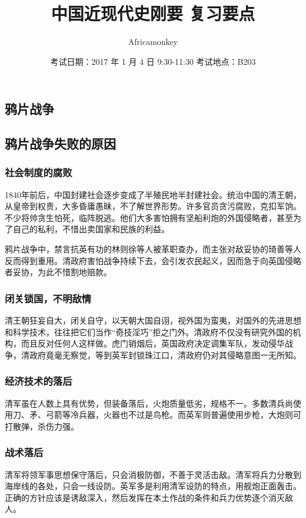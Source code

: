\documentclass{article}
\begin{document}
\begin{CJK}{UTF8}{song}
\title{中国近现代史刚要 复习要点}
\author {Africamonkey}
\date {考试日期：2017 年 1 月 4 日 9:30-11:30   考试地点：B203 }
\maketitle

\section{鸦片战争}
\subsection{鸦片战争失败的原因}
\subsubsection{社会制度的腐败}
1840年前后，中国封建社会逐步变成了半殖民地半封建社会。统治中国的清王朝，从皇帝到权贵，大多昏庸愚昧，不了解世界形势。许多官员贪污腐败，克扣军饷。不少将帅贪生怕死，临阵脱逃。他们大多害怕拥有坚船利炮的外国侵略者，甚至为了自己的私利，不惜出卖国家和民族的利益。 

鸦片战争中，禁言抗英有功的林则徐等人被革职查办，而主张对敌妥协的琦善等人反而得到重用。清政府害怕战争持续下去，会引发农民起义，因而急于向英国侵略者妥协，为此不惜割地赔款。
\subsubsection{闭关锁国，不明敌情}
清王朝狂妄自大，闭关自守，以天朝大国自诩，视外国为蛮夷，对国外的先进思想和科学技术，往往把它们当作“奇技淫巧”拒之门外。清政府不仅没有研究外国的机构，而且反对任何人这样做。虎门销烟后，英国政府决定调集军队，发动侵华战争，清政府竟毫无察觉，等到英军封锁珠江口，清政府仍对其侵略意图一无所知。
\subsubsection{经济技术的落后}
清军虽在人数上具有优势，但装备落后，火炮质量低劣，规格不一。多数清兵尚使用刀、矛、弓箭等冷兵器，火器也不过是鸟枪。而英军则普遍使用步枪，大炮则可打散弹，杀伤力强。
\subsubsection{战术落后}
清军将领军事思想保守落后，只会消极防御，不善于灵活击敌。清军将兵力分散到海岸线的各处，只会一线设防。英军多是利用清军设防的特点，用舰炮正面轰击。正确的方针应该是诱敌深入，然后发挥在本土作战的条件和兵力优势逐个消灭敌人。


\end{CJK}
\end{document}
